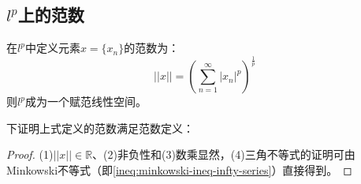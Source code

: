 \subsection{$l^p$上的范数}
\begin{definition}
	在$l^p$中定义元素$x=\{x_n\}$的范数为：
	\begin{equation*}
		||x||=\left(\sum_{n=1}^{\infty}|x_n|^p\right)^\frac{1}{p}
	\end{equation*}
	则$l^p$成为一个赋范线性空间。
\end{definition}
下证明上式定义的范数满足范数定义：
\begin{proof}
	(1)$||x||\in\mathbb{R}$、(2)非负性和(3)数乘显然，(4)三角不等式的证明可由Minkowski不等式（即\cref{ineq:minkowski-ineq-infty-series}）直接得到。
\end{proof}